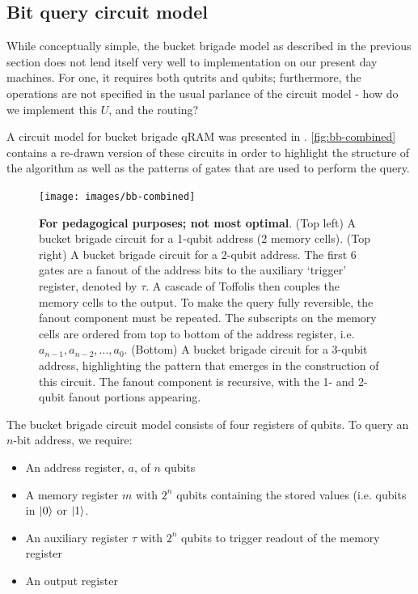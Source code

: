 \documentclass[a4paper,12pt]{article}
\begin{document}
\subsection{Bit query circuit model}

While conceptually simple, the bucket brigade model as described in the previous section does not lend itself very well to implementation on our present day machines. 
For one, it requires both qutrits and qubits; furthermore, the operations are not specified in the usual parlance of the circuit model - how do we implement this $U$, and the routing?

A circuit model for bucket brigade qRAM was presented in \cite{Arunachalam2015}.
\autoref{fig:bb-combined} contains a re-drawn version of these circuits in order to highlight the structure of the algorithm as well as the patterns of gates that are used to perform the query.

\begin{figure}
 \centering
  \captionsetup{width=.89\linewidth}
 \texttt{[image: images/bb-combined]}
 \caption{\textbf{For pedagogical purposes; not most optimal}. 
 (Top left) A bucket brigade circuit for a 1-qubit address (2 memory cells). 
 (Top right) A bucket brigade circuit for a 2-qubit address. 
 The first 6 gates are a fanout of the address bits to the auxiliary `trigger' register, denoted by $\tau$. 
 A cascade of Toffolis then couples the memory cells to the output. 
 To make the query fully reversible, the fanout component must be repeated. 
 The subscripts on the memory cells are ordered from top to bottom of the address register, i.e. $a_{n-1}, a_{n-2}, \ldots, a_0$. 
 (Bottom) A bucket brigade circuit for a 3-qubit address, highlighting the pattern that emerges in the construction of this circuit. 
 The fanout component is recursive, with the 1- and 2-qubit fanout portions appearing.}
 \label{fig:bb-combined}
\end{figure}


The bucket brigade circuit model consists of four registers of qubits. 
To query an $n$-bit address, we require:
\begin{itemize}
 \item An address register, $a$, of $n$ qubits
 \item A memory register $m$ with $2^n$ qubits containing the stored values (i.e. qubits in $\ket{0}$ or $\ket{1}$.
 \item An auxiliary register $\tau$ with $2^n$ qubits to trigger readout of the memory register
 \item An output register
\end{itemize}
\end{document}

